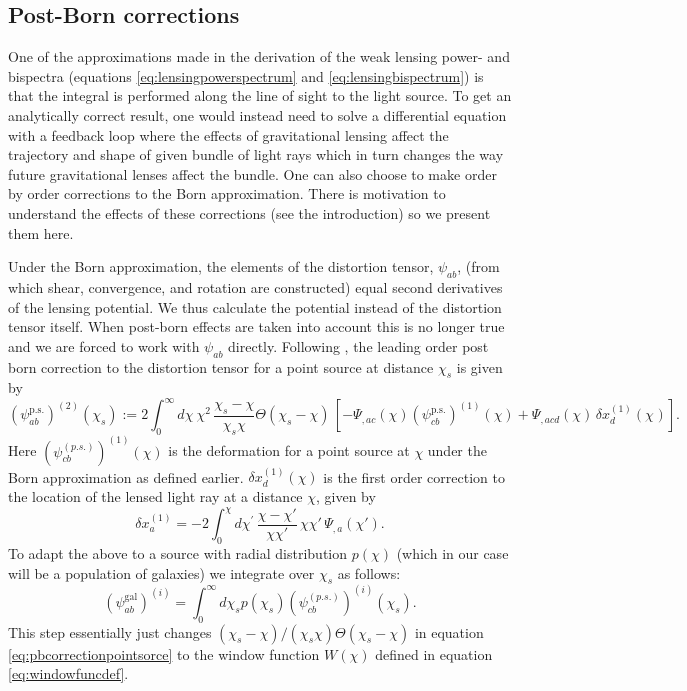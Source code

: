 \documentclass[11pt]{article} %
\begin{document}
\subsection{Post-Born corrections}
One of the approximations made in the derivation of the weak lensing power- and bispectra (equations \eqref{eq:lensingpowerspectrum} and \eqref{eq:lensingbispectrum}) is that the integral is performed along the line of sight to the light source. To get an analytically correct result, one would instead need to solve a differential equation with a feedback loop where the effects of gravitational lensing affect the trajectory and shape of given bundle of light rays which in turn changes the way future gravitational lenses affect the bundle. One can also choose to make order by order corrections to the Born approximation. There is motivation to understand the effects of these corrections (see the introduction) so we present them here.

Under the Born approximation, the elements of the distortion tensor, $\psi_{ab}$, (from which shear, convergence, and rotation are constructed) equal second derivatives of the lensing potential. We thus calculate the potential instead of the distortion tensor itself. When post-born effects are taken into account this is no longer true and we are forced to work with $\psi_{ab}$ directly. Following \cite{postborn_pratten_lewis}, the leading order post born correction to the distortion tensor for a point source at distance $\chi_s$ is given by
\begin{equation}
    \left( \psi_{ab}^{\text{p.s.}}  \right)^{(2)}(\chi_s) := 2 \int^{\infty}_0 d \chi^{} \, \chi^2 \, \frac{\chi_s - \chi}{\chi_s\chi}\Theta(\chi_s - \chi) \, \left[ - \Psi_{,ac} (\chi) \left(\psi^{\text{p.s.}}_{cb}\right)^{(1)} (\chi) + \Psi_{,acd} (\chi) \, \delta x_d^{(1)} (\chi^{}) \right].
    \label{eq:pbcorrectionpointsorce}
\end{equation}
Here $\left(\psi_{cb}^{(p.s.)}\right)^{(1)}(\chi)$ is the deformation for a point source at $\chi$ under the Born approximation as defined earlier. $\delta x_d^{(1)}(\chi)$ is the first order correction to the location of the lensed light ray at a distance $\chi$, given by
\begin{equation}
\delta x_a^{(1)} = -2 \int^{\chi}_0 d \chi^{\prime} \, \frac{\chi-\chi'}{\chi\chi'} \, \chi \chi' \, \Psi_{,a} (\chi').
\end{equation}
To adapt the above to a source with radial distribution $p(\chi)$ (which in our case will be a population of galaxies) we integrate over $\chi_s$ as follows:
\begin{equation}
    (\psi_{ab}^{\text{gal}})^{(i)} = \int_0^\infty d \chi_s p(\chi_s)\left(\psi_{cb}^{(p.s.)}\right)^{(i)}(\chi_s).
\end{equation}
This step essentially just changes $(\chi_s - \chi)/(\chi_s\chi)\Theta(\chi_s-\chi)$ in equation \eqref{eq:pbcorrectionpointsorce} to the window function $W(\chi)$ defined in equation \eqref{eq:windowfuncdef}.
\end{document}
